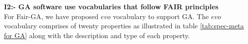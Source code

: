 \documentclass[preprint,12pt]{elsarticle}
\begin{document}



\textbf{I2:- GA software use vocabularies that follow FAIR principles}\\
For Fair-GA, we have proposed $evo$ vocabulary to support GA. The $evo$ vocabulary comprises of twenty properties as illustrated in table \ref{tab:spec-meta for GA} along with the description and type of each property. \\
\end{document}
